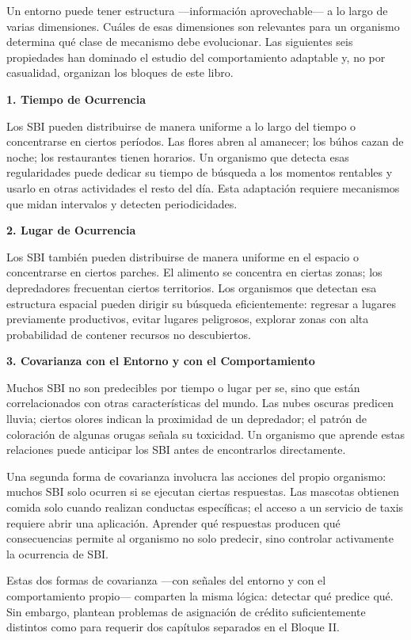 \documentclass[
  letterpaper,
  DIV=11,
  numbers=noendperiod]{scrreprt}
\begin{document}
Un entorno puede tener estructura ---información aprovechable--- a lo
largo de varias dimensiones. Cuáles de esas dimensiones son relevantes
para un organismo determina qué clase de mecanismo debe evolucionar. Las
siguientes seis propiedades han dominado el estudio del comportamiento
adaptable y, no por casualidad, organizan los bloques de este libro.

\textbf{1. Tiempo de Ocurrencia}

Los SBI pueden distribuirse de manera uniforme a lo largo del tiempo o
concentrarse en ciertos períodos. Las flores abren al amanecer; los
búhos cazan de noche; los restaurantes tienen horarios. Un organismo que
detecta esas regularidades puede dedicar su tiempo de búsqueda a los
momentos rentables y usarlo en otras actividades el resto del día. Esta
adaptación requiere mecanismos que midan intervalos y detecten
periodicidades.

\textbf{2. Lugar de Ocurrencia}

Los SBI también pueden distribuirse de manera uniforme en el espacio o
concentrarse en ciertos parches. El alimento se concentra en ciertas
zonas; los depredadores frecuentan ciertos territorios. Los organismos
que detectan esa estructura espacial pueden dirigir su búsqueda
eficientemente: regresar a lugares previamente productivos, evitar
lugares peligrosos, explorar zonas con alta probabilidad de contener
recursos no descubiertos.

\textbf{3. Covarianza con el Entorno y con el Comportamiento}

Muchos SBI no son predecibles por tiempo o lugar per se, sino que están
correlacionados con otras características del mundo. Las nubes oscuras
predicen lluvia; ciertos olores indican la proximidad de un depredador;
el patrón de coloración de algunas orugas señala su toxicidad. Un
organismo que aprende estas relaciones puede anticipar los SBI antes de
encontrarlos directamente.

Una segunda forma de covarianza involucra las acciones del propio
organismo: muchos SBI solo ocurren si se ejecutan ciertas respuestas.
Las mascotas obtienen comida solo cuando realizan conductas específicas;
el acceso a un servicio de taxis requiere abrir una aplicación. Aprender
qué respuestas producen qué consecuencias permite al organismo no solo
predecir, sino controlar activamente la ocurrencia de SBI.

Estas dos formas de covarianza ---con señales del entorno y con el
comportamiento propio--- comparten la misma lógica: detectar qué predice
qué. Sin embargo, plantean problemas de asignación de crédito
suficientemente distintos como para requerir dos capítulos separados en
el Bloque II.
\end{document}
